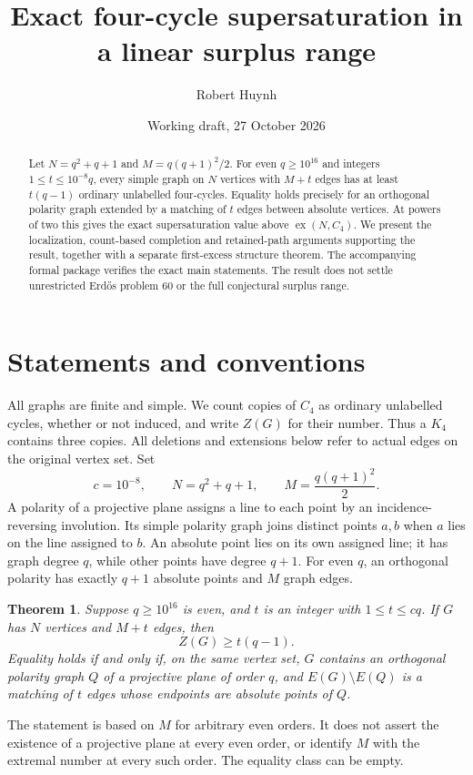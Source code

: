 \documentclass[11pt]{article}
\title{Exact four-cycle supersaturation in a linear surplus range}
\author{Robert Huynh}
\date{Working draft, 27 October 2026}
\newtheorem{theorem}{Theorem}
\theoremstyle{remark}\newtheorem*{remark}{Remark}
\begin{document}
\maketitle
\begin{abstract}
Let $N=q^2+q+1$ and $M=q(q+1)^2/2$. For even $q\geq10^{16}$ and integers $1\leq t\leq10^{-8}q$, every simple graph on $N$ vertices with $M+t$ edges has at least $t(q-1)$ ordinary unlabelled four-cycles. Equality holds precisely for an orthogonal polarity graph extended by a matching of $t$ edges between absolute vertices. At powers of two this gives the exact supersaturation value above $\operatorname{ex}(N,C_4)$. We present the localization, count-based completion and retained-path arguments supporting the result, together with a separate first-excess structure theorem. The accompanying formal package verifies the exact main statements. The result does not settle unrestricted Erd\H{o}s problem 60 or the full conjectural surplus range.
\end{abstract}
\tableofcontents

\section{Statements and conventions}
All graphs are finite and simple. We count copies of $C_4$ as ordinary unlabelled cycles, whether or not induced, and write $Z(G)$ for their number. Thus a $K_4$ contains three copies. All deletions and extensions below refer to actual edges on the original vertex set. Set
\[
 c=10^{-8},\qquad N=q^2+q+1,\qquad M=\frac{q(q+1)^2}{2}.
\]
A polarity of a projective plane assigns a line to each point by an incidence-reversing involution. Its simple polarity graph joins distinct points $a,b$ when $a$ lies on the line assigned to $b$. An absolute point lies on its own assigned line; it has graph degree $q$, while other points have degree $q+1$. For even $q$, an orthogonal polarity has exactly $q+1$ absolute points and $M$ graph edges.

\begin{theorem}\label{thm:main}
Suppose $q\geq10^{16}$ is even, and $t$ is an integer with $1\leq t\leq cq$. If $G$ has $N$ vertices and $M+t$ edges, then
\[
 Z(G)\geq t(q-1).
\]
Equality holds if and only if, on the same vertex set, $G$ contains an orthogonal polarity graph $Q$ of a projective plane of order $q$, and $E(G)\setminus E(Q)$ is a matching of $t$ edges whose endpoints are absolute points of $Q$.
\end{theorem}
The statement is based on $M$ for arbitrary even orders. It does not assert the existence of a projective plane at every even order, or identify $M$ with the extremal number at every such order. The equality class can be empty.
\end{document}
